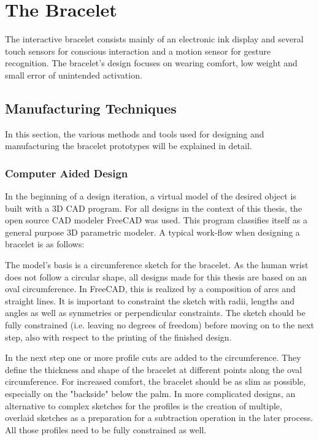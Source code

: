 \chapter{The Bracelet}

The interactive bracelet consists mainly of an electronic ink display and several touch sensors for conscious interaction and a motion sensor for gesture recognition. The bracelet's design focuses on wearing comfort, low weight and small error of unintended activation.

\section{Manufacturing Techniques}

In this section, the various methods and tools used for designing and manufacturing the bracelet prototypes will be explained in detail.

\subsection{Computer Aided Design}
In the beginning of a design iteration, a virtual model of the desired object is built with a 3D \ac{CAD} program. For all designs in the context of this thesis, the open source \ac{CAD} modeler FreeCAD\cite{freecad} was used. This program classifies itself as a general purpose 3D parametric modeler. A typical work-flow when designing a bracelet is as follows:

The model's basis is a circumference sketch for the bracelet. As the human wrist does not follow a circular shape, all designs made for this thesis are based on an oval circumference. In FreeCAD, this is realized by a composition of arcs and straight lines. It is important to constraint the sketch with radii, lengths and angles as well as symmetries or perpendicular constraints. The sketch should be fully constrained (i.e. leaving no degrees of freedom) before moving on to the next step, also with respect to the printing of the finished design.

In the next step one or more profile cuts are added to the circumference. They define the thickness and shape of the bracelet at different points along the oval circumference. For increased comfort, the bracelet should be as slim as possible, especially on the "backside" below the palm. In more complicated designs, an alternative to complex sketches for the profiles is the creation of multiple, overlaid sketches as a preparation for a subtraction operation in the later process. All those profiles need to be fully constrained as well.

